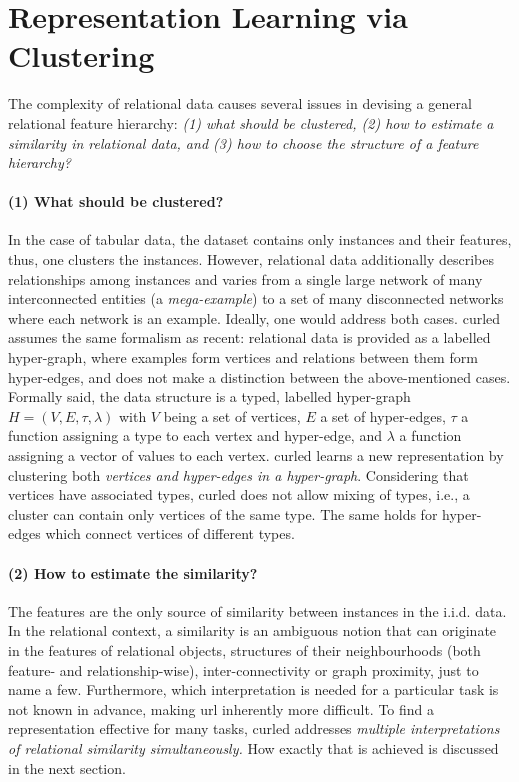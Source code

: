 \section{Representation Learning via Clustering}
\label{sec:RL}

The complexity of relational data causes several issues in devising a general relational feature hierarchy: \textit{(1) what should be clustered, (2) how to estimate a similarity in relational data, and (3) how to choose the structure of a feature hierarchy? }


\paragraph{(1) What should be clustered?}
In the case of tabular data, the dataset contains only instances and their features, thus, one clusters the instances.
However, relational data additionally describes relationships among instances and  varies from a single large network of many interconnected entities (a \textit{mega-example}) to a set of many disconnected networks where each network is an example.
Ideally, one would address both cases.
\gls{curled} assumes the same formalism as \gls{recent}: relational data is provided as a labelled hyper-graph, where examples form vertices and relations between them form hyper-edges, and does not make a distinction between the above-mentioned cases.
Formally said, the data structure is a typed, labelled hyper-graph $H = (V,E, \tau, \lambda)$ with $V$ being a set of vertices, $E$ a set of hyper-edges, $\tau$  a function  assigning a type to each vertex and hyper-edge, and $\lambda$ a function assigning a vector of values to each vertex.
\gls{curled} learns a new representation by clustering both \textit{vertices and hyper-edges in a hyper-graph}.
Considering that vertices have associated types, \gls{curled} does not allow mixing of types, i.e., a cluster can contain only vertices of the same type.
The same holds for hyper-edges which connect vertices of different types.





\paragraph{(2) How to estimate the similarity?}
The features are the only source of similarity between instances in the i.i.d. data.
In the relational context, a similarity is an ambiguous notion that can originate in the  features of relational objects, structures of their neighbourhoods (both feature- and relationship-wise), inter-connectivity or graph proximity, just to name a few.
Furthermore, which interpretation is needed for a particular task is not known in advance, making \gls{url} inherently more difficult.
To find a representation effective for many tasks, \gls{curled} addresses \textit{multiple interpretations of relational similarity simultaneously.}
How exactly that is achieved is discussed in the next section.



